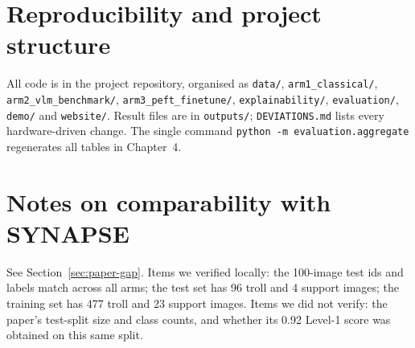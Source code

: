 \section{Reproducibility and project structure}

All code is in the project repository, organised as \texttt{data/}, \texttt{arm1\_classical/}, \texttt{arm2\_vlm\_benchmark/}, \texttt{arm3\_peft\_finetune/}, \texttt{explainability/}, \texttt{evaluation/}, \texttt{demo/} and \texttt{website/}. Result files are in \texttt{outputs/}; \texttt{DEVIATIONS.md} lists every hardware-driven change. The single command \texttt{python -m evaluation.aggregate} regenerates all tables in Chapter~4.

\section{Notes on comparability with SYNAPSE}

See Section~\ref{sec:paper-gap}. Items we verified locally: the 100-image test ids and labels match across all arms; the test set has 96 troll and 4 support images; the training set has 477 troll and 23 support images. Items we did not verify: the paper's test-split size and class counts, and whether its 0.92 Level-1 score was obtained on this same split.
